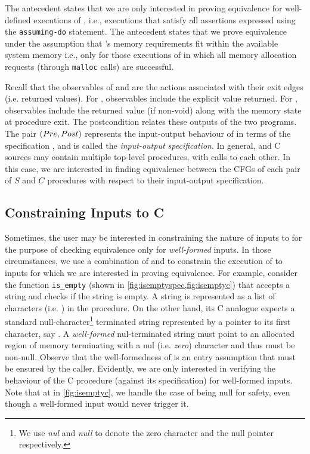 The \sdef{} antecedent states that we are only interested in proving equivalence for
well-defined executions of \sprog{}, i.e., executions that satisfy all assertions expressed
using the {\tt assuming-do} statement.
The \cfits{} antecedent states that we prove equivalence under the assumption that \cprog{}'s memory
requirements fit within the available system memory i.e., only for those executions of \cprog{}
in which all memory allocation requests (through {\tt malloc} calls) are successful.

Recall that the observables of \sprog{} and \cprog{} are the actions associated with their exit edges (i.e. returned values).
For \sprog{}, observables include the explicit value returned.
For \cprog{}, observables include the returned value (if non-void) along with the memory state at procedure exit.
The postcondition \post{} relates these outputs of the two programs.
The pair $({Pre}{},{Post}{})$ represents the input-output behaviour of \cprog{} in terms of the specification \sprog{},
and is called the {\em input-output specification}.
In general, \SpecL{} and C sources may contain multiple top-level procedures, with calls to each other.
In this case, we are interested in finding equivalence between the CFGs of each pair
of $S$ and $C$ procedures with respect to their input-output specification.

\subsection{Constraining Inputs to C}
\label{sec:cinputcons}
Sometimes, the user may be interested in constraining the nature of inputs to \cprog{}
for the purpose of checking equivalence only for {\em well-formed} inputs.
In those circumstances, we use a combination of \sdef{} and \pre{} to constrain
the execution of \cprog{} to inputs for which we are interested in proving equivalence.
For example, consider the function {\tt is\_empty} (shown in \cref{fig:isemptyspec,fig:isemptyc})
that accepts a string and checks if the string is empty.
A string is represented as a list of characters (i.e. ) in the \SpecL{} procedure.
On the other hand, its C analogue expects a standard null-character\footnote{
We use {\em nul} and {\em null} to denote the zero character and the null pointer respectively.}
terminated string represented by a pointer
to its first character, say .
A {\em well-formed} nul-terminated string must point to an allocated region of memory terminating with a nul (i.e. {\em zero}) character
and thus  must be non-null.
Observe that the well-formedness of  is an entry assumption that must be ensured by the caller.
Evidently, we are only interested in verifying the behaviour of the C procedure (against its specification) for
well-formed inputs.
Note that at  in \cref{fig:isemptyc}, we handle the case of  being null for safety,
even though a well-formed input would never trigger it.

